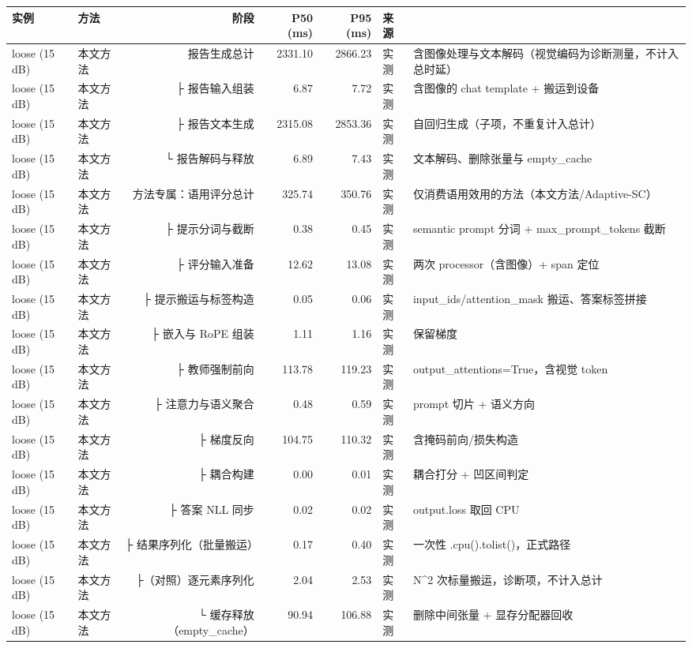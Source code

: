 \begin{tabular}{llrrrl}
\hline
实例 & 方法 & 阶段 & P50 (ms) & P95 (ms) & 来源\\
\hline
loose (15 dB) & 本文方法 & 报告生成总计 & 2331.10 & 2866.23 & 实测 & 含图像处理与文本解码（视觉编码为诊断测量，不计入总时延）\\
loose (15 dB) & 本文方法 & ├ 报告输入组装 & 6.87 & 7.72 & 实测 & 含图像的 chat template + 搬运到设备\\
loose (15 dB) & 本文方法 & ├ 报告文本生成 & 2315.08 & 2853.36 & 实测 & 自回归生成（子项，不重复计入总计）\\
loose (15 dB) & 本文方法 & └ 报告解码与释放 & 6.89 & 7.43 & 实测 & 文本解码、删除张量与 empty_cache\\
loose (15 dB) & 本文方法 & 方法专属：语用评分总计 & 325.74 & 350.76 & 实测 & 仅消费语用效用的方法（本文方法/Adaptive-SC）\\
loose (15 dB) & 本文方法 & ├ 提示分词与截断 & 0.38 & 0.45 & 实测 & semantic prompt 分词 + max_prompt_tokens 截断\\
loose (15 dB) & 本文方法 & ├ 评分输入准备 & 12.62 & 13.08 & 实测 & 两次 processor（含图像）+ span 定位\\
loose (15 dB) & 本文方法 & ├ 提示搬运与标签构造 & 0.05 & 0.06 & 实测 & input_ids/attention_mask 搬运、答案标签拼接\\
loose (15 dB) & 本文方法 & ├ 嵌入与 RoPE 组装 & 1.11 & 1.16 & 实测 & 保留梯度\\
loose (15 dB) & 本文方法 & ├ 教师强制前向 & 113.78 & 119.23 & 实测 & output_attentions=True，含视觉 token\\
loose (15 dB) & 本文方法 & ├ 注意力与语义聚合 & 0.48 & 0.59 & 实测 & prompt 切片 + 语义方向\\
loose (15 dB) & 本文方法 & ├ 梯度反向 & 104.75 & 110.32 & 实测 & 含掩码前向/损失构造\\
loose (15 dB) & 本文方法 & ├ 耦合构建 & 0.00 & 0.01 & 实测 & 耦合打分 + 凹区间判定\\
loose (15 dB) & 本文方法 & ├ 答案 NLL 同步 & 0.02 & 0.02 & 实测 & output.loss 取回 CPU\\
loose (15 dB) & 本文方法 & ├ 结果序列化（批量搬运） & 0.17 & 0.40 & 实测 & 一次性 .cpu().tolist()，正式路径\\
loose (15 dB) & 本文方法 & ├（对照）逐元素序列化 & 2.04 & 2.53 & 实测 & N^2 次标量搬运，诊断项，不计入总计\\
loose (15 dB) & 本文方法 & └ 缓存释放（empty_cache） & 90.94 & 106.88 & 实测 & 删除中间张量 + 显存分配器回收\\

\end{tabular}
